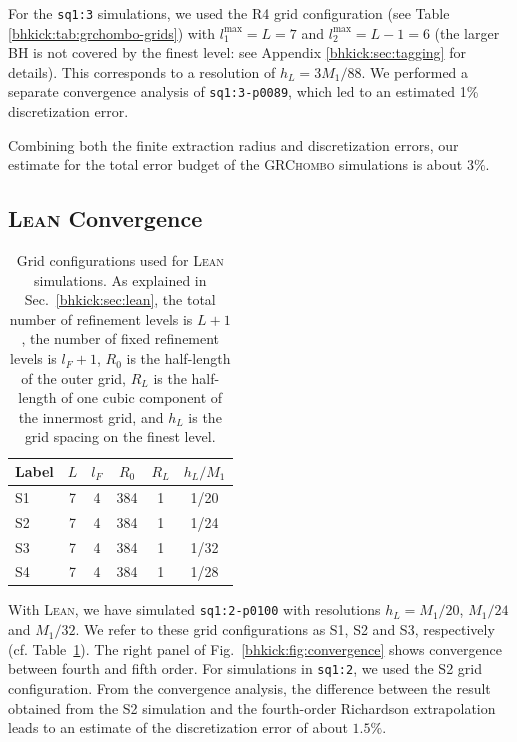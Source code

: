 For the \texttt{sq1:3} simulations, we used the R4 grid configuration
(see Table \ref{bhkick:tab:grchombo-grids}) with $l_1^{\max}=L=7$ and
$l_2^{\max}=L-1=6$ (the larger BH is not covered by the finest level:
see Appendix \ref{bhkick:sec:tagging} for details). This corresponds to a
resolution of $h_L=3M_1/88$. We performed a separate convergence
analysis of \texttt{sq1:3-p0089}, which led to an estimated 1\%
discretization error.

Combining both the finite extraction radius and discretization errors,
our estimate for the total error budget of the \textsc{GRChombo}
simulations is about $3\%$.


\subsection{\textsc{Lean} Convergence}
\begin{table}[b]

    \caption{Grid configurations used for \textsc{Lean} simulations. As
    explained in Sec.~\ref{bhkick:sec:lean}, the total number of refinement
    levels is $L+1$, the number of fixed refinement levels is $l_F+1$,
    $R_0$ is the half-length of the outer grid, $R_L$ is the half-length
    of one cubic component of the innermost grid, and $h_L$ is the grid
    spacing on the finest level.}
    \centering
    \begin{tabular}{lccccc} \hline
        Label & $L$ & $l_F$ & $R_0$ & $R_L$ & $h_L/M_1$\\
        \hline
        S1 & 7 & 4 & 384 & 1 & 1/20\\
        S2 & 7 & 4 & 384 & 1 & 1/24\\
        S3 & 7 & 4 & 384 & 1 & 1/32\\
        S4 & 7 & 4 & 384 & 1 & 1/28\\ \hline
    \end{tabular}

    \label{bhkick:tab:lean-grids}
\end{table}

With \textsc{Lean}, we have simulated \texttt{sq1:2-p0100} with
resolutions $h_L = M_1/20$, $M_1/24$ and $M_1/32$. We refer to these
grid configurations as S1, S2 and S3, respectively
(cf. Table~\ref{bhkick:tab:lean-grids}). The right panel of Fig.~\ref{bhkick:fig:convergence}
shows convergence between fourth and fifth order. For simulations in
\texttt{sq1:2}, we used the S2 grid configuration. From the
convergence analysis, the difference between the result obtained from
the S2 simulation and the fourth-order Richardson extrapolation leads
to an estimate of the discretization error of about $1.5\%$.


